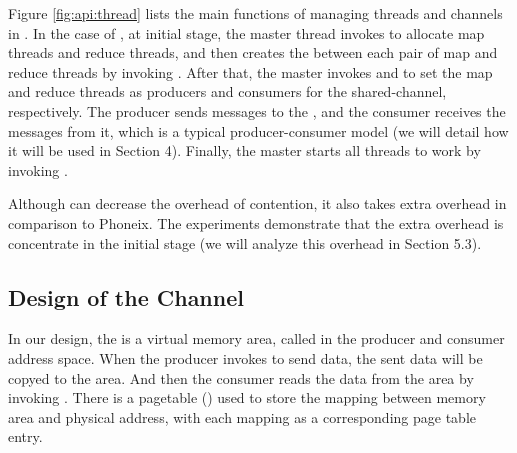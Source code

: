 Figure \ref{fig:api:thread} lists the main functions of managing threads and channels in \myth.
In the case of \myds, at initial stage, the master thread invokes  to allocate map threads and reduce threads, and then creates the   between each pair of map and reduce threads by invoking .
After that, the master invokes  and  to set the map and reduce threads as producers and consumers for the shared-channel, respectively.
The producer sends messages to the , and the consumer receives the messages from it,
which is a typical producer-consumer model (we will detail how it will be used in Section 4). 
Finally, the master starts all threads to work by invoking .

Although \myth can decrease the overhead of contention,
it also takes extra overhead in comparison to Phoneix. The experiments demonstrate that the extra overhead 
is concentrate in the initial stage (we will analyze this overhead in Section 5.3). 


\subsection{Design of the Channel}
In our design, the  is a virtual memory area, called  in the producer and consumer address space.
When the producer invokes  to send data, the sent data will be copyed to the  area.
And then the consumer reads the data from the  area  by invoking .
There is a pagetable () used to store the mapping between  memory area and physical address, with each mapping as a corresponding page table entry.




